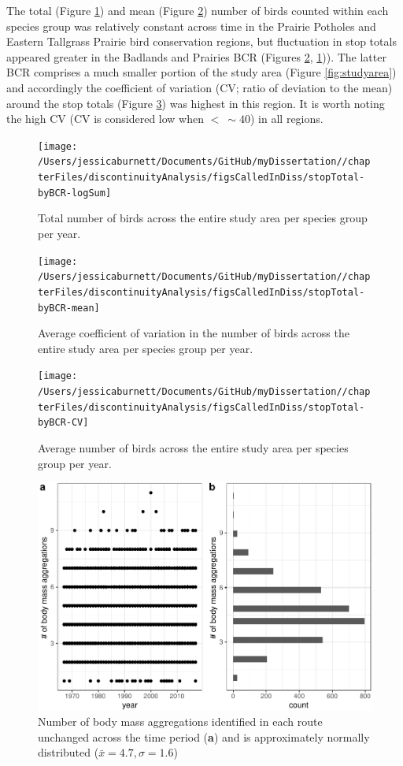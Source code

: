 \documentclass[12pt,twoside,openany]{reedthesis}
\begin{document}
The total (Figure \ref{fig:stopTotalSum}) and mean (Figure \ref{fig:stopTotalMean}) number of birds counted within each species group was relatively constant across time in the Prairie Potholes and Eastern Tallgrass Prairie bird conservation regions, but fluctuation in stop totals appeared greater in the Badlands and Prairies BCR (Figures \ref{fig:stopTotalMean}, \ref{fig:stopTotalSum})). The latter BCR comprises a much smaller portion of the study area (Figure \ref{fig:studyarea}) and accordingly the coefficient of variation (CV; ratio of deviation to the mean) around the stop totals (Figure \ref{fig:stopTotalCV}) was highest in this region. It is worth noting the high CV (CV is considered low when \(<\ \sim40%
\)) in all regions.
\begin{figure}
\texttt{[image: /Users/jessicaburnett/Documents/GitHub/myDissertation//chapterFiles/discontinuityAnalysis/figsCalledInDiss/stopTotal-byBCR-logSum]} \caption{Total number of birds across the entire study area per species group per year. }\label{fig:stopTotalSum}
\end{figure}
\begin{figure}
\texttt{[image: /Users/jessicaburnett/Documents/GitHub/myDissertation//chapterFiles/discontinuityAnalysis/figsCalledInDiss/stopTotal-byBCR-mean]} \caption{Average coefficient of variation in the number of birds across the entire study area per species group per year.}\label{fig:stopTotalMean}
\end{figure}
\begin{figure}
\texttt{[image: /Users/jessicaburnett/Documents/GitHub/myDissertation//chapterFiles/discontinuityAnalysis/figsCalledInDiss/stopTotal-byBCR-CV]} \caption{Average number of birds across the entire study area per species group per year. }\label{fig:stopTotalCV}
\end{figure}
\begin{figure}
\centering
\includegraphics{_myDissertation_files/figure-latex/nAggsPerYear-1.pdf}
\caption{\label{fig:nAggsPerYear}Number of body mass aggregations identified in each route unchanged across the time period (\textbf{a}) and is approximately normally distributed (\(\bar{x} = 4.7, \sigma = 1.6\))}
\end{figure}
\end{document}
